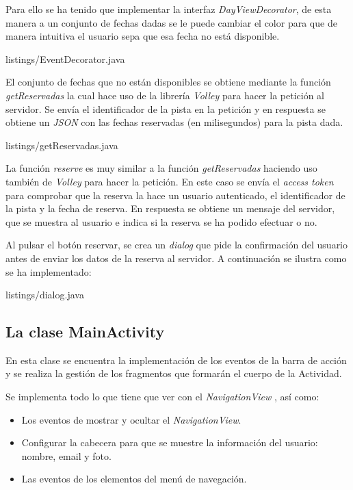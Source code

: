 Para ello se ha tenido que implementar la interfaz \textit{DayViewDecorator}, de esta manera a un conjunto de fechas dadas se le puede cambiar el color para que de manera intuitiva el usuario sepa que esa fecha no está disponible. 
\newline


{listings/EventDecorator.java} %

El conjunto de fechas que no están disponibles se obtiene mediante la función \textit{getReservadas} la cual hace uso de la librería \textit{Volley} \cite{URL::Volley} para hacer la petición al servidor. Se envía el identificador de la pista en la petición y en respuesta se obtiene un \textit{JSON} con las fechas reservadas (en milisegundos) para la pista dada.
\newpage

{listings/getReservadas.java} %

La función \textit{reserve} es muy similar a la función \textit{getReservadas} haciendo uso también de \textit{Volley} para hacer la petición. En este caso se envía el \textit{access token} para comprobar que la reserva la hace un usuario autenticado, el identificador de la pista y la fecha de reserva. En respuesta se obtiene un mensaje del servidor, que se muestra al usuario e indica si la reserva se ha podido efectuar o no. 

Al pulsar el botón reservar, se crea un \textit{dialog} \cite{URL::Dialog} que pide la confirmación del usuario antes de enviar los datos de la reserva al servidor. A continuación se ilustra como se ha implementado:


{listings/dialog.java} %

\subsection{La clase MainActivity}
En esta clase se encuentra la implementación de los eventos de la barra de acción y se realiza la gestión de los fragmentos que formarán el cuerpo de la Actividad. 

Se implementa todo lo que tiene que ver con el \textit{NavigationView} \cite{URL::NavigationView}, así como:

\begin{itemize}
\item Los eventos de mostrar y ocultar el \textit{NavigationView}.
\item Configurar la cabecera para que se muestre la información del usuario: nombre, email y foto.
\item Las eventos de los elementos del menú de navegación.
\end{itemize}

